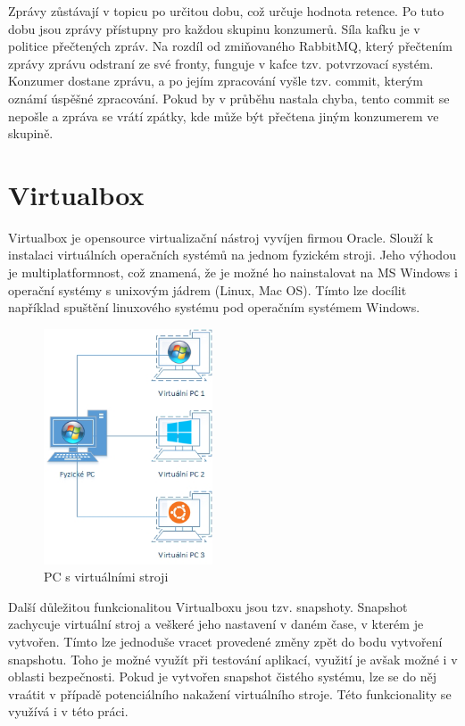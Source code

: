 \documentclass[thesis=M,czech,hidelinks]{FITthesis}[2013/05/06]
\begin{document}
Zprávy zůstávají v topicu po určitou dobu, což určuje hodnota retence. Po tuto dobu jsou zprávy přístupny pro každou skupinu konzumerů. Síla kafku je v politice přečtených zpráv. Na rozdíl od zmiňovaného RabbitMQ, který přečtením zprávy zprávu odstraní ze své fronty, funguje v kafce tzv. potvrzovací systém. Konzumer dostane zprávu, a po jejím zpracování vyšle tzv. commit, kterým oznámí úspěšné zpracování. Pokud by v průběhu nastala chyba, tento commit se nepošle a zpráva se vrátí zpátky, kde může být přečtena jiným konzumerem ve skupině.

\section{Virtualbox}\label{sec:virtualbox}
Virtualbox je opensource virtualizační nástroj vyvíjen firmou Oracle. Slouží k instalaci virtuálních operačních systémů na jednom fyzickém stroji. Jeho výhodou je multiplatformnost, což znamená, že je možné ho nainstalovat na MS Windows i operační systémy s unixovým jádrem (Linux, Mac OS). Tímto lze docílit například spuštění linuxového systému pod operačním systémem Windows.\cite{virutalbox}
\begin{figure}[h]
	\centering
	\includegraphics[width=5cm]{pictures/vbox.png}
	\caption{PC s virtuálními stroji \cite{vbox_pic}}
	\label{fig:vbox}
\end{figure}

Další důležitou funkcionalitou Virtualboxu jsou tzv. snapshoty. Snapshot zachycuje virtuální stroj a veškeré jeho nastavení v daném čase, v kterém je vytvořen. Tímto lze jednoduše vracet provedené změny zpět do bodu vytvoření snapshotu. Toho je možné využít při testování aplikací, využití je avšak možné i v oblasti bezpečnosti. Pokud je vytvořen snapshot čistého systému, lze se do něj vraátit v případě potenciálního nakažení virtuálního stroje. Této funkcionality se využívá i v této práci.
\end{document}
